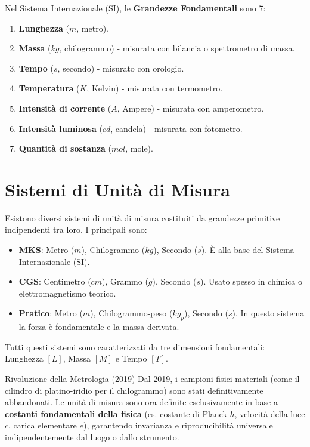 Nel Sistema Internazionale (SI), le \textbf{Grandezze Fondamentali} sono 7:
\begin{enumerate}
    \item \textbf{Lunghezza} ($m$, metro).
    \item \textbf{Massa} ($kg$, chilogrammo) - misurata con bilancia o spettrometro di massa.
    \item \textbf{Tempo} ($s$, secondo) - misurato con orologio.
    \item \textbf{Temperatura} ($K$, Kelvin) - misurata con termometro.
    \item \textbf{Intensità di corrente} ($A$, Ampere) - misurata con amperometro.
    \item \textbf{Intensità luminosa} ($cd$, candela) - misurata con fotometro.
    \item \textbf{Quantità di sostanza} ($mol$, mole).
\end{enumerate}

\section{Sistemi di Unità di Misura}
Esistono diversi sistemi di unità di misura costituiti da grandezze primitive indipendenti tra loro. I principali sono:
\begin{itemize}
    \item \textbf{MKS}: Metro ($m$), Chilogrammo ($kg$), Secondo ($s$). È alla base del Sistema Internazionale (SI).
    \item \textbf{CGS}: Centimetro ($cm$), Grammo ($g$), Secondo ($s$). Usato spesso in chimica o elettromagnetismo teorico.
    \item \textbf{Pratico}: Metro ($m$), Chilogrammo-peso ($kg_p$), Secondo ($s$). In questo sistema la forza è fondamentale e la massa derivata.
\end{itemize}

Tutti questi sistemi sono caratterizzati da tre dimensioni fondamentali: Lunghezza $[L]$, Massa $[M]$ e Tempo $[T]$.

\begin{osservazione}{Rivoluzione della Metrologia (2019)}
Dal 2019, i campioni fisici materiali (come il cilindro di platino-iridio per il chilogrammo) sono stati definitivamente abbandonati. Le unità di misura sono ora definite esclusivamente in base a \textbf{costanti fondamentali della fisica} (es. costante di Planck $h$, velocità della luce $c$, carica elementare $e$), garantendo invarianza e riproducibilità universale indipendentemente dal luogo o dallo strumento.
\end{osservazione}

